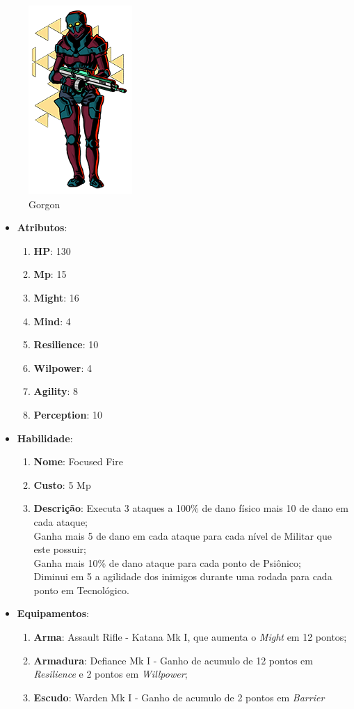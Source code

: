 \documentclass[11pt]{article} %
\begin{document}
\begin{figure}[!htp]
\centering
\includegraphics[scale=0.5]{res/characters/Gorgon.png}
\caption{Gorgon}
\label{Gorgon}
\end{figure}

\begin{itemize}
\item \textbf{Atributos}:
  \begin{enumerate}
    \item \textbf{HP}: 130
    \item \textbf{Mp}: 15
    \item \textbf{Might}: 16
    \item \textbf{Mind}: 4
    \item \textbf{Resilience}: 10
    \item \textbf{Wilpower}: 4
    \item \textbf{Agility}: 8
    \item \textbf{Perception}: 10
  \end{enumerate}
\item \textbf{Habilidade}:
  \begin{enumerate}
    \item \textbf{Nome}: Focused Fire
    \item \textbf{Custo}: 5 Mp
    \item \textbf{Descrição}: Executa 3 ataques a 100\% de dano físico mais 10 de dano em cada ataque;\\
    Ganha mais 5 de dano em cada ataque para cada nível de Militar que este possuir;\\
    Ganha mais 10\% de dano ataque para cada ponto de Psiônico;\\
    Diminui em 5 a agilidade dos inimigos durante uma rodada para cada ponto em Tecnológico.
  \end{enumerate}
\item \textbf{Equipamentos}:
  \begin{enumerate}
    \item \textbf{Arma}: Assault Rifle - Katana Mk I, que aumenta o \textit{Might} em 12 pontos;
    \item \textbf{Armadura}: Defiance Mk I - Ganho de acumulo de 12 pontos em \textit{Resilience} e 2 pontos em \textit{Willpower};
    \item \textbf{Escudo}: Warden Mk I - Ganho de acumulo de 2 pontos em \textit{Barrier}
  \end{enumerate}
\end{itemize}
\end{document}
